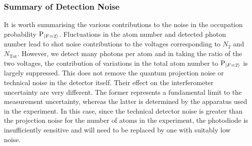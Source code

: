 \subsubsection{Summary of Detection Noise}
It is worth summarising the various contributions to the noise in the
occupation probability $\text{P}_{\ket{F=2}}$. Fluctuations in the
atom number and detected photon number lead to shot noise
contributions to the voltages corresponding to $N_2$ and
$N_\text{Tot}$. However, we detect many photons per atom and in taking
the ratio of the two voltages, the contribution of variations in the
total atom number to $\text{P}_{\ket{F=2}}$ is largely suppressed.
This does not remove the quantum projection noise or technical noise
in the detector itself. Their effect on the interferometer uncertainty
are very different. The former represents a
fundamental limit to the measurement uncertainty, whereas the latter
is determined by the apparatus used in the experiment. In this case,
since the technical detector noise is greater than the projection
noise for the number of atoms in the experiment, the photodiode is
insufficiently sensitive and will need to be replaced by one with suitably
low noise.

